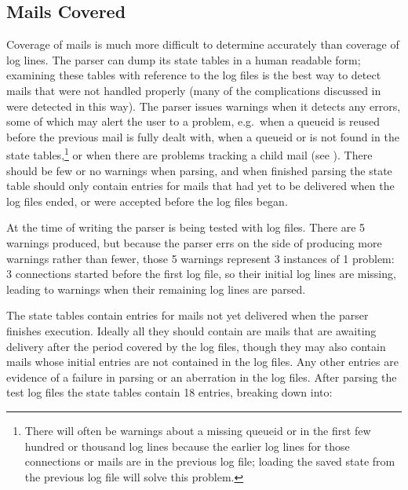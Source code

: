 \subsection{Mails Covered}

\label{mails-covered}

Coverage of mails is much more difficult to determine accurately than
coverage of log lines.  The parser can dump its state tables in a human
readable form; examining these tables with reference to the log files is
the best way to detect mails that were not handled properly (many of the
complications discussed in  were detected in this
way).  The parser issues warnings when it detects any errors, some of which
may alert the user to a problem, e.g.\ when a queueid is reused before the
previous mail is fully dealt with, when a queueid or  is not
found in the state tables,\footnote{There will often be warnings about a
missing queueid or  in the first few hundred or thousand log
lines because the earlier log lines for those connections or mails are in
the previous log file; loading the saved state from the previous log file
will solve this problem.} or when there are problems tracking a child mail
(see ).  There should be few or no
warnings when parsing, and when finished parsing the state table should
only contain entries for mails that had yet to be delivered when the log
files ended, or were accepted before the log files began.

At the time of writing the parser is being tested with \numberOFlogFILES{}
log files.  There are 5 warnings produced, but because the parser errs on
the side of producing more warnings rather than fewer, those 5 warnings
represent 3 instances of 1 problem: 3 connections started before the first
log file, so their initial log lines are missing, leading to warnings when
their remaining log lines are parsed.

The state tables contain entries for mails not yet delivered when the
parser finishes execution.  Ideally all they should contain are mails that
are awaiting delivery after the period covered by the log files, though
they may also contain mails whose initial entries are not contained in the
log files.  Any other entries are evidence of a failure in parsing or an
aberration in the log files.  After parsing the \numberOFlogFILES{} test
log files the state tables contain 18 entries, breaking down into:


